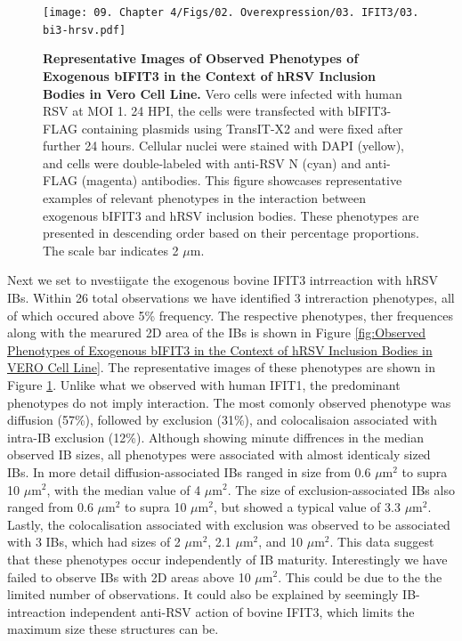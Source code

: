 \begin{figure}
    \centering
    \texttt{[image: 09. Chapter 4/Figs/02. Overexpression/03. IFIT3/03. bi3-hrsv.pdf]}
    \caption[Representative Images of Observed Phenotypes of Exogenous bIFIT3 in the Context of hRSV Inclusion Bodies in Vero Cell Line.]{\textbf{Representative Images of Observed Phenotypes of Exogenous bIFIT3 in the Context of hRSV Inclusion Bodies in Vero Cell Line.} Vero cells were infected with human RSV at MOI 1. 24 HPI, the cells were transfected with bIFIT3-FLAG containing plasmids using TransIT-X2 and were fixed after further 24 hours. Cellular nuclei were stained with DAPI (yellow), and cells were double-labeled with anti-RSV N (cyan) and anti-FLAG (magenta) antibodies. This figure showcases representative examples of relevant phenotypes in the interaction between exogenous bIFIT3 and hRSV inclusion bodies. These phenotypes are presented in descending order based on their percentage proportions. The scale bar indicates 2 \(\mu \mbox{m}\).}
    \label{fig:Representative Images of Observed Phenotypes of Exogenous bIFIT3 in the Context of hRSV Inclusion Bodies in VERO Cell Line}
\end{figure}

Next we set to nvestiigate the exogenous bovine IFIT3 intrreaction with hRSV IBs. Within 26 total observations we have identified 3 intreraction phenotypes, all of which occured above 5\% frequency. The respective phenotypes, ther frequences along with the mearured 2D area of the IBs is shown in Figure \ref{fig:Observed Phenotypes of Exogenous bIFIT3 in the Context of hRSV Inclusion Bodies in VERO Cell Line}. The representative images of these phenotypes are shown in Figure \ref{fig:Representative Images of Observed Phenotypes of Exogenous bIFIT3 in the Context of hRSV Inclusion Bodies in VERO Cell Line}. Unlike what we observed with human IFIT1, the predominant phenotypes do not imply interaction. The most comonly observed phenotype was diffusion (57\%), followed by exclusion (31\%), and colocalisaion associated with intra-IB exclusion (12\%). Although showing minute diffrences in the median observed IB sizes, all phenotypes were associated with almost identicaly sized IBs. In more detail diffusion-associated IBs ranged in size from 0.6 \(\mu \mbox{m}^2\) to supra 10 \(\mu \mbox{m}^2\), with the median value of 4 \(\mu \mbox{m}^2\). The size of exclusion-associated IBs also ranged from 0.6 \(\mu \mbox{m}^2\) to supra 10 \(\mu \mbox{m}^2\), but showed a typical value of 3.3 \(\mu \mbox{m}^2\). Lastly, the colocalisation associated with exclusion was observed to be associated with 3 IBs, which had sizes of 2 \(\mu \mbox{m}^2\), 2.1 \(\mu \mbox{m}^2\), and 10 \(\mu \mbox{m}^2\). This data suggest that these phenotypes occur independently of IB maturity. Interestingly we have failed to observe IBs with 2D areas above 10 \(\mu \mbox{m}^2\). This could be due to the the limited number of observations. It could also be explained by seemingly IB-intreaction independent anti-RSV action of bovine IFIT3, which limits the maximum size these structures can be.

